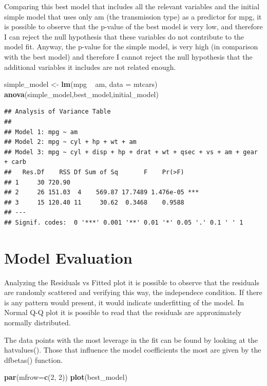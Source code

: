 \documentclass[]{article}
\newenvironment{Shaded}{\begin{snugshade}}{\end{snugshade}}
\newcommand{\KeywordTok}[1]{\textcolor[rgb]{0.13,0.29,0.53}{\textbf{{#1}}}}
\newcommand{\DataTypeTok}[1]{\textcolor[rgb]{0.13,0.29,0.53}{{#1}}}
\newcommand{\DecValTok}[1]{\textcolor[rgb]{0.00,0.00,0.81}{{#1}}}
\newcommand{\StringTok}[1]{\textcolor[rgb]{0.31,0.60,0.02}{{#1}}}
\newcommand{\NormalTok}[1]{{#1}}
\begin{document}
Comparing this best model that includes all the relevant variables and
the initial simple model that uses only am (the transmission type) as a
predictor for mpg, it is possible to observe that the p-value of the
best model is very low, and therefore I can reject the null hypothesis
that these variables do not contribute to the model fit. Anyway, the
p-value for the simple model, is very high (in comparison with the best
model) and therefore I cannot reject the null hypothesis that the
additional variables it includes are not related enough.

\begin{Shaded}
\begin{Highlighting}[]
\NormalTok{simple_model <-}\StringTok{ }\KeywordTok{lm}\NormalTok{(mpg ~}\StringTok{ }\NormalTok{am, }\DataTypeTok{data =} \NormalTok{mtcars)}
\KeywordTok{anova}\NormalTok{(simple_model,best_model,initial_model)}
\end{Highlighting}
\end{Shaded}

\begin{verbatim}
## Analysis of Variance Table
## 
## Model 1: mpg ~ am
## Model 2: mpg ~ cyl + hp + wt + am
## Model 3: mpg ~ cyl + disp + hp + drat + wt + qsec + vs + am + gear + carb
##   Res.Df    RSS Df Sum of Sq       F    Pr(>F)    
## 1     30 720.90                                   
## 2     26 151.03  4    569.87 17.7489 1.476e-05 ***
## 3     15 120.40 11     30.62  0.3468    0.9588    
## ---
## Signif. codes:  0 '***' 0.001 '**' 0.01 '*' 0.05 '.' 0.1 ' ' 1
\end{verbatim}

\section{Model Evaluation}\label{model-evaluation}

Analyzing the Residuals vs Fitted plot it is possible to observe that
the residuals are randomly scattered and verifying this way, the
independece condition. If there is any pattern would present, it would
indicate underfitting of the model. In Normal Q-Q plot it is possible to
read that the residuals are approximately normally distributed.

The data points with the most leverage in the fit can be found by
looking at the hatvalues(). Those that influence the model coefficients
the most are given by the dfbetas() function.

\begin{Shaded}
\begin{Highlighting}[]
\KeywordTok{par}\NormalTok{(}\DataTypeTok{mfrow=}\KeywordTok{c}\NormalTok{(}\DecValTok{2}\NormalTok{, }\DecValTok{2}\NormalTok{))}
\KeywordTok{plot}\NormalTok{(best_model)}
\end{Highlighting}
\end{Shaded}
\end{document}
